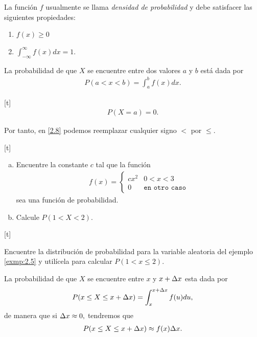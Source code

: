 	La función $f$ usualmente se llama \emph{densidad de probabilidad} y debe satisfacer las siguientes propiedades:
	\begin{enumerate}
		\item $f(x)\geq 0 $
		\item $\displaystyle \int_{-\infty}^{\infty}f(x)dx=1.$
	\end{enumerate}




	La probabilidad de que $X$ se encuentre entre dos valores $a$ y $b$ está dada por
	\begin{align}
		\label{2.8}
		P(a < x <b)=\int_{a}^{b}f(x)dx.
	\end{align}


[t]
	\begin{align}
		\label{exmp:2.4}
		P(X=a)=0.
	\end{align}


Por tanto, en \eqref{2.8} podemos reemplazar cualquier signo $<$ por $\leq.$

[t]
	\begin{ejemplo}
		\label{exmp:2.5}
		\begin{enumerate}[(a)]
			\item Encuentre la constante $c$ tal que la función
			\begin{align}
				f(x)=
				\begin{cases}
					cx^{2} & 0 < x < 3 \\
					0 & \texttt{en otro caso}
				\end{cases}
			\end{align}
			sea una función de probabilidad. 
			\item Calcule $P(1 < X < 2).$
		\end{enumerate}

	\end{ejemplo}


[t]
	\begin{ejemplo}
	  \label{exmp:2.6}
	  Encuentre la distribución de probabilidad para la variable aleatoria del ejemplo
	  \ref{exmp:2.5} y utilícela para calcular $P(1 < x \leq 2).$
	\end{ejemplo}



	La probabilidad de que $X$ se encuentre entre $x$ y $x+\Delta x$ esta dada por
	\begin{align}
		\label{2.9}
		P(x \leq X \leq x+\Delta x)= \int_{x}^{x+\Delta x}f(u)du,
	\end{align} 
	de manera que si $\Delta x \approx 0,$ tendremos que
	\begin{align}
		\label{2.10}
		P(x \leq X \leq x+\Delta x)\approx f(x) \Delta x.
	\end{align}



